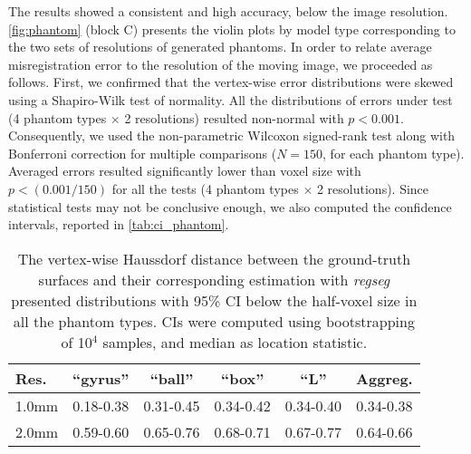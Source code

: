 The results showed a consistent and high accuracy, below the image resolution.
\autoref{fig:phantom} (block C) presents the violin plots by model type corresponding
  to the two sets of resolutions of generated phantoms.
In order to relate average misregistration error to the resolution of the moving image,
  we proceeded as follows.
First, we confirmed that the vertex-wise error distributions were skewed using a Shapiro-Wilk test of
  normality.
All the distributions of errors under test (4 phantom types $\times$ 2 resolutions) resulted
  non-normal with $p<0.001$.
Consequently, we used the non-parametric Wilcoxon signed-rank test along with Bonferroni
  correction for multiple comparisons ($N=150$, for each phantom type).
Averaged errors resulted significantly lower than voxel size with $p < (0.001 / 150)$
  for all the tests (4 phantom types $\times$ 2 resolutions).
Since statistical tests may not be conclusive enough, we also computed the confidence intervals,
  reported in \autoref{tab:ci_phantom}.


\begin{table}
		\centering
		\footnotesize
    \tabcolsep=0.1cm
    \begin{tabular}{lccccc}
    Res.   & ``gyrus'' & ``ball''  & ``box''   & ``L''     & Aggreg.    \\\hline
    1.0mm  & 0.18-0.38 & 0.31-0.45 & 0.34-0.42 & 0.34-0.40 & 0.34-0.38  \\
    2.0mm  & 0.59-0.60 & 0.65-0.76 & 0.68-0.71 & 0.67-0.77 & 0.64-0.66  \\
    \hline
    \end{tabular}
    \caption{The vertex-wise Haussdorf distance between the ground-truth surfaces and their
    corresponding estimation with \emph{regseg} presented distributions with 95\% CI below
    the half-voxel size in all the phantom types.
    CIs were computed using bootstrapping of 10$^4$ samples, and median as location statistic.}\label{tab:ci_phantom}
\end{table}

